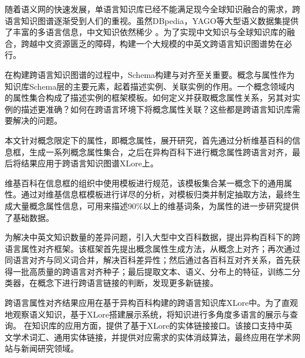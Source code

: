 \begin{cabstract}
随着语义网的快速发展，单语言知识库已经不能满足现今全球知识融合的需求，跨语言知识图谱逐渐受到人们的重视。虽然DBpedia，YAGO等大型语义数据集提供了丰富的多语言信息，中文知识依然稀少
。为了实现中文知识与全球知识库的融合，跨越中文资源匮乏的障碍，构建一个大规模的中英文跨语言知识图谱势在必行。

在构建跨语言知识图谱的过程中，Schema构建与对齐至关重要。概念与属性作为知识库Schema层的主要元素，起着描述实例、关联实例的作用。一个概念领域内的属性集合构成了描述实例的框架模板。如何定义并获取概念属性关系，另其对实例的描述更准确？如何在跨语言环境下将概念属性关联？这些都是跨语言知识库需要解决的问题。

本文针对概念限定下的属性，即概念属性，展开研究，首先通过分析维基百科的信息框，生成一系列概念属性集合，之后在异构百科下进行概念属性跨语言对齐，最后将结果应用于跨语言知识图谱XLore上。

维基百科在信息框的组织中使用模板进行规范，该模板集合某一概念下的通用属性。通过对维基信息框模板进行详尽的分析，对模板归类并制定抽取方法，最终生成大量概念属性信息，可用来描述90\%以上的维基词条，为属性的进一步研究提供了基础数据。

为解决中英文知识数量的差异问题，引入大型中文百科数据，提出异构百科下的跨语言属性对齐框架。该框架首先提出概念属性生成方法，从概念上对齐；再次通过同语言对齐与同义词合并，解决百科差异性；然后通过各百科互对齐关系，首先获得一批高质量的跨语言对齐种子；最后提取文本、语义、分布上的特征，训练二分类器，在概念下进行跨语言链接的判断，发现更多新链接。

跨语言属性对齐结果应用在基于异构百科构建的跨语言知识库XLore中。为了直观地观察语义知识，基于XLore搭建展示系统，将知识进行多角度多语言的展示与查询。 
在知识库的应用方面，提供了基于XLore的实体链接接口。该接口支持中英文学术词汇、通用实体链接，并提供对应需求的实体消歧算法，最终应用在学术网站与新闻研究领域。

\end{cabstract}


